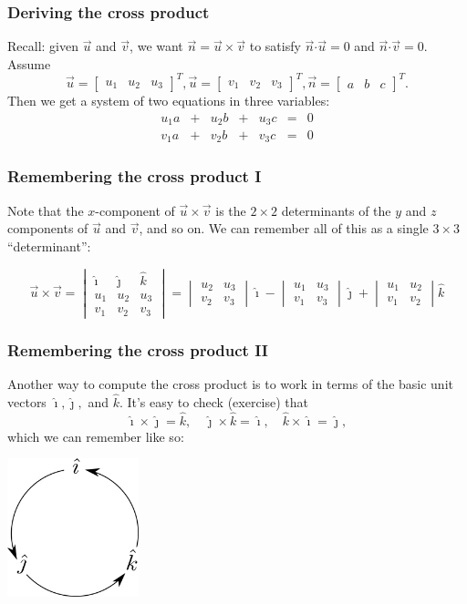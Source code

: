 \documentclass[11pt,t]{beamer}
\newcommand{\dotp}{\boldsymbol{\cdot}}
\begin{document}
\begin{frame}\frametitle{Deriving the cross product}
 Recall: given $\vec{u}$ and $\vec{v}$, we want $\vec{n}=\vec{u}\times \vec{v}$ to satisfy $\vec{n}\dotp \vec{u} = 0$ and $\vec{n}\dotp\vec{v}=0$. Assume
\[
 \vec{u}=\begin{bmatrix}u_1&u_2&u_3\end{bmatrix}^T,\vec{u}=\begin{bmatrix}v_1&v_2&v_3\end{bmatrix}^T,\vec{n}=\begin{bmatrix}a&b&c\end{bmatrix}^T.
\]
Then we get a system of two equations in three variables:
\[
 \begin{array}{ccccccc}
  u_1a&+&u_2b&+&u_3c&=&0\\
  v_1a&+&v_2b&+&v_3c&=&0
 \end{array}
\]
\end{frame}
\begin{frame}\frametitle{Remembering the cross product I}
 Note that the $x$-component of $\vec{u}\times \vec{v}$ is the $2\times 2$ determinants of the $y$ and $z$ components of $\vec{u}$ and $\vec{v}$, and so on. We can remember all of this as a single $3\times 3$ ``determinant'':

\[
 \vec{u}\times \vec{v} = \begin{vmatrix}\hat{\imath}&\hat{\jmath}&\hat{k}\\
                          u_1&u_2&u_3\\v_1&v_2&v_3
                         \end{vmatrix}= \begin{vmatrix}u_2&u_3\\v_2&v_3\end{vmatrix}\hat{\imath} -\begin{vmatrix}u_1&u_3\\v_1&v_3\end{vmatrix}\hat{\jmath} + \begin{vmatrix}u_1&u_2\\v_1&v_2\end{vmatrix}\hat{k}
\]

\end{frame}
\begin{frame}\frametitle{Remembering the cross product II}
 Another way to compute the cross product is to work in terms of the basic unit vectors $\hat{\imath},\hat{\jmath},$ and $\hat{k}$. It's easy to check (exercise) that
\[
 \hat{\imath}\times\hat{\jmath}=\hat{k},\quad \hat{\jmath}\times\hat{k}=\hat{\imath}, \quad \hat{k}\times\hat{\imath}=\hat{\jmath},
\]
which we can remember like so:
\begin{center}
 \includegraphics[width=1.5in]{ijk.pdf}
\end{center}

\end{frame}
\end{document}
